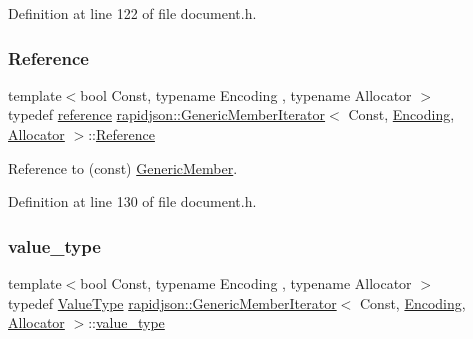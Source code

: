 Definition at line 122 of file document.\+h.

\mbox{\label{classrapidjson_1_1_generic_member_iterator_abe27838f8dc71fdb38028ef27ae0b4f2}} 
\subsubsection{\texorpdfstring{Reference}{Reference}}
{\footnotesize\ttfamily template$<$bool Const, typename Encoding , typename Allocator $>$ \\
typedef \mbox{\hyperlink{classrapidjson_1_1_generic_member_iterator_ab7d2d79f74f084b9b5abd42ef891536d}{reference}} \mbox{\hyperlink{classrapidjson_1_1_generic_member_iterator}{rapidjson\+::\+Generic\+Member\+Iterator}}$<$ Const, \mbox{\hyperlink{classrapidjson_1_1_encoding}{Encoding}}, \mbox{\hyperlink{classrapidjson_1_1_allocator}{Allocator}} $>$\+::\mbox{\hyperlink{classrapidjson_1_1_generic_member_iterator_abe27838f8dc71fdb38028ef27ae0b4f2}{Reference}}}



Reference to (const) \mbox{\hyperlink{structrapidjson_1_1_generic_member}{Generic\+Member}}. 



Definition at line 130 of file document.\+h.

\mbox{\label{classrapidjson_1_1_generic_member_iterator_afc86203583390c3b719a2c9298866a7e}} 
\subsubsection{\texorpdfstring{value\_type}{value\_type}}
{\footnotesize\ttfamily template$<$bool Const, typename Encoding , typename Allocator $>$ \\
typedef \mbox{\hyperlink{classrapidjson_1_1_generic_member_iterator_ad2b02bbaddb3cc35db1d6a70d7850481}{Value\+Type}} \mbox{\hyperlink{classrapidjson_1_1_generic_member_iterator}{rapidjson\+::\+Generic\+Member\+Iterator}}$<$ Const, \mbox{\hyperlink{classrapidjson_1_1_encoding}{Encoding}}, \mbox{\hyperlink{classrapidjson_1_1_allocator}{Allocator}} $>$\+::\mbox{\hyperlink{classrapidjson_1_1_generic_member_iterator_afc86203583390c3b719a2c9298866a7e}{value\+\_\+type}}}




